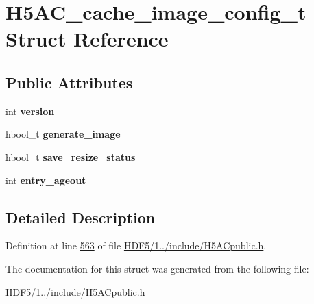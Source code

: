 \hypertarget{struct_h5_a_c__cache__image__config__t}{}\section{H5\+A\+C\+\_\+cache\+\_\+image\+\_\+config\+\_\+t Struct Reference}
\label{struct_h5_a_c__cache__image__config__t}
\subsection*{Public Attributes}
\begin{DoxyCompactItemize}
\item 
\mbox{\label{struct_h5_a_c__cache__image__config__t_a32f1ac5499ecaee22ea19c2ce8d71965}} 
int {\bfseries version}
\item 
\mbox{\label{struct_h5_a_c__cache__image__config__t_a3088de887fc4a887af0ee5e352509b2b}} 
hbool\+\_\+t {\bfseries generate\+\_\+image}
\item 
\mbox{\label{struct_h5_a_c__cache__image__config__t_af7ddde257cb02c7f6472f92b7f823df9}} 
hbool\+\_\+t {\bfseries save\+\_\+resize\+\_\+status}
\item 
\mbox{\label{struct_h5_a_c__cache__image__config__t_ac89878800c19595509c75329d9055e7b}} 
int {\bfseries entry\+\_\+ageout}
\end{DoxyCompactItemize}


\subsection{Detailed Description}


Definition at line \hyperlink{_h_d_f5_21_810_81_2include_2_h5_a_cpublic_8h_source_l00563}{563} of file \hyperlink{_h_d_f5_21_810_81_2include_2_h5_a_cpublic_8h_source}{H\+D\+F5/1../include/\+H5\+A\+Cpublic.\+h}.



The documentation for this struct was generated from the following file\+:\begin{DoxyCompactItemize}
\item 
H\+D\+F5/1../include/\+H5\+A\+Cpublic.\+h\end{DoxyCompactItemize}

